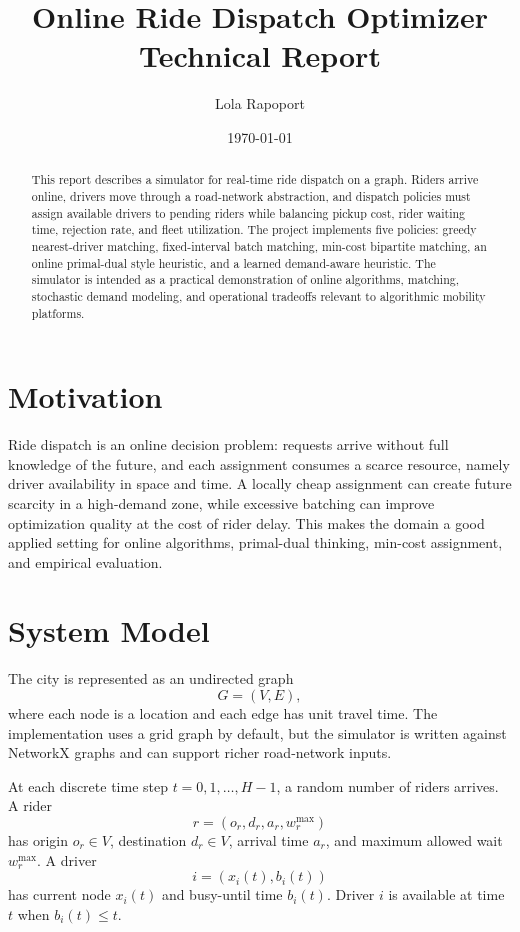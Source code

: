 \documentclass[11pt]{article}
\title{Online Ride Dispatch Optimizer\\Technical Report}
\author{Lola Rapoport}
\date{\today}
\begin{document}
\maketitle

\begin{abstract}
This report describes a simulator for real-time ride dispatch on a graph. Riders arrive online, drivers move through a road-network abstraction, and dispatch policies must assign available drivers to pending riders while balancing pickup cost, rider waiting time, rejection rate, and fleet utilization. The project implements five policies: greedy nearest-driver matching, fixed-interval batch matching, min-cost bipartite matching, an online primal-dual style heuristic, and a learned demand-aware heuristic. The simulator is intended as a practical demonstration of online algorithms, matching, stochastic demand modeling, and operational tradeoffs relevant to algorithmic mobility platforms.
\end{abstract}

\section{Motivation}

Ride dispatch is an online decision problem: requests arrive without full knowledge of the future, and each assignment consumes a scarce resource, namely driver availability in space and time. A locally cheap assignment can create future scarcity in a high-demand zone, while excessive batching can improve optimization quality at the cost of rider delay. This makes the domain a good applied setting for online algorithms, primal-dual thinking, min-cost assignment, and empirical evaluation.

\section{System Model}

The city is represented as an undirected graph
\[
G = (V, E),
\]
where each node is a location and each edge has unit travel time. The implementation uses a grid graph by default, but the simulator is written against NetworkX graphs and can support richer road-network inputs.

At each discrete time step \(t = 0, 1, \ldots, H-1\), a random number of riders arrives. A rider
\[
r = (o_r, d_r, a_r, w_r^{\max})
\]
has origin \(o_r \in V\), destination \(d_r \in V\), arrival time \(a_r\), and maximum allowed wait \(w_r^{\max}\). A driver
\[
i = (x_i(t), b_i(t))
\]
has current node \(x_i(t)\) and busy-until time \(b_i(t)\). Driver \(i\) is available at time \(t\) when \(b_i(t) \leq t\).
\end{document}
